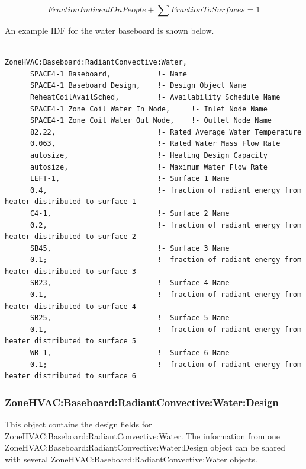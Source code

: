 \begin{equation}
FractionIndicentOnPeople + \sum {FractionToSurfaces = 1}
\end{equation}

An example IDF for the water baseboard is shown below.

\begin{lstlisting}

ZoneHVAC:Baseboard:RadiantConvective:Water,
      SPACE4-1 Baseboard,           !- Name
      SPACE4-1 Baseboard Design,    !- Design Object Name
      ReheatCoilAvailSched,         !- Availability Schedule Name
      SPACE4-1 Zone Coil Water In Node,     !- Inlet Node Name
      SPACE4-1 Zone Coil Water Out Node,    !- Outlet Node Name
      82.22,                        !- Rated Average Water Temperature
      0.063,                        !- Rated Water Mass Flow Rate
      autosize,                     !- Heating Design Capacity
      autosize,                     !- Maximum Water Flow Rate
      LEFT-1,                       !- Surface 1 Name
      0.4,                          !- fraction of radiant energy from heater distributed to surface 1
      C4-1,                         !- Surface 2 Name
      0.2,                          !- fraction of radiant energy from heater distributed to surface 2
      SB45,                         !- Surface 3 Name
      0.1;                          !- fraction of radiant energy from heater distributed to surface 3
      SB23,                         !- Surface 4 Name
      0.1,                          !- fraction of radiant energy from heater distributed to surface 4
      SB25,                         !- Surface 5 Name
      0.1,                          !- fraction of radiant energy from heater distributed to surface 5
      WR-1,                         !- Surface 6 Name
      0.1;                          !- fraction of radiant energy from heater distributed to surface 6
\end{lstlisting}

\subsubsection{ZoneHVAC:Baseboard:RadiantConvective:Water:Design}\label{ZoneHVAC:Baseboard:RadiantConvective:Water:Design}

This object contains the design fields for ZoneHVAC:Baseboard:RadiantConvective:Water. The information from one ZoneHVAC:Baseboard:RadiantConvective:Water:Design object can be shared with several ZoneHVAC:Baseboard:RadiantConvective:Water objects.

